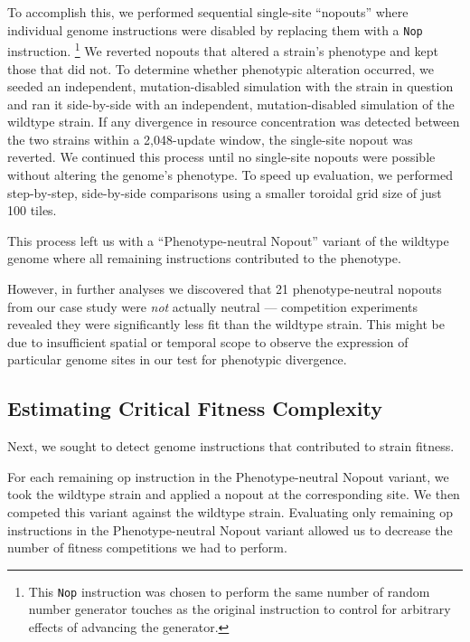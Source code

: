 To accomplish this, we performed sequential single-site ``nopouts'' where individual genome instructions were disabled by replacing them with a \texttt{Nop} instruction.
\footnote{
This \texttt{Nop} instruction was chosen to perform the same number of random number generator touches as the original instruction to control for arbitrary effects of advancing the generator.
}
We reverted nopouts that altered a strain's phenotype and kept those that did not.
To determine whether phenotypic alteration occurred, we seeded an independent, mutation-disabled simulation with the strain in question and ran it side-by-side with an independent, mutation-disabled simulation of the wildtype strain.
If any divergence in resource concentration was detected between the two strains within a 2,048-update window, the single-site nopout was reverted.
We continued this process until no single-site nopouts were possible without altering the genome's phenotype.
To speed up evaluation, we performed step-by-step, side-by-side comparisons using a smaller toroidal grid size of just 100 tiles.

This process left us with a ``Phenotype-neutral Nopout'' variant of the wildtype genome where all remaining instructions contributed to the phenotype.

However, in further analyses we discovered that 21 phenotype-neutral nopouts from our case study were \textit{not} actually neutral --- competition experiments revealed they were significantly less fit than the wildtype strain.
This might be due to insufficient spatial or temporal scope to observe the expression of particular genome sites in our test for phenotypic divergence.

\subsection{Estimating Critical Fitness Complexity}

Next, we sought to detect genome instructions that contributed to strain fitness.

For each remaining op instruction in the Phenotype-neutral Nopout variant, we took the wildtype strain and applied a nopout at the corresponding site.
We then competed this variant against the wildtype strain.
Evaluating only remaining op instructions in the Phenotype-neutral Nopout variant allowed us to decrease the number of fitness competitions we had to perform.


